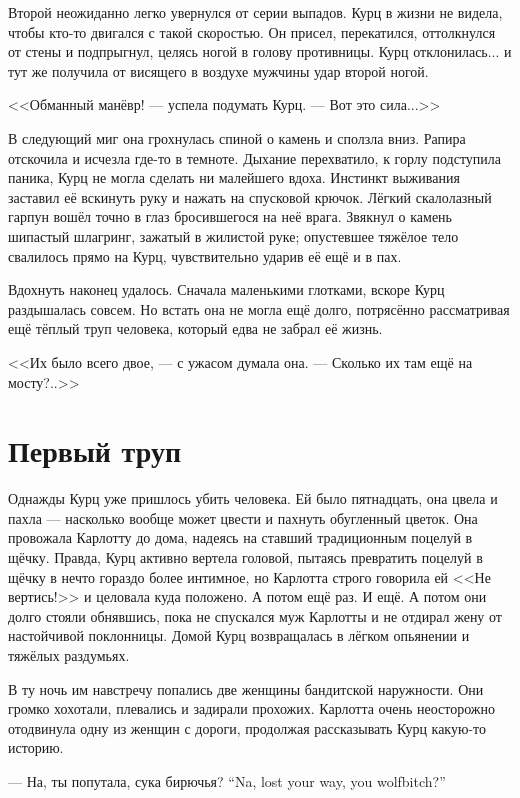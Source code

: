 Второй неожиданно легко увернулся от серии выпадов.
Курц в жизни не видела, чтобы кто-то двигался с такой скоростью.
Он присел, перекатился, оттолкнулся от стены и подпрыгнул, целясь ногой в голову противницы.
Курц отклонилась... и тут же получила от висящего в воздухе мужчины удар второй ногой.

<<Обманный манёвр! --- успела подумать Курц.
--- Вот это сила...>>

В следующий миг она грохнулась спиной о камень и сползла вниз.
Рапира отскочила и исчезла где-то в темноте.
Дыхание перехватило, к горлу подступила паника, Курц не могла сделать ни малейшего вдоха.
Инстинкт выживания заставил её вскинуть руку и нажать на спусковой крючок.
Лёгкий скалолазный гарпун вошёл точно в глаз бросившегося на неё врага.
Звякнул о камень шипастый шлагринг, зажатый в жилистой руке;
опустевшее тяжёлое тело свалилось прямо на Курц, чувствительно ударив её ещё и в пах.

Вдохнуть наконец удалось.
Сначала маленькими глотками, вскоре Курц раздышалась совсем.
Но встать она не могла ещё долго, потрясённо рассматривая ещё тёплый труп человека, который едва не забрал её жизнь.

<<Их было всего двое, --- с ужасом думала она.
--- Сколько их там ещё на мосту?..>>

\section{Первый труп}

Однажды Курц уже пришлось убить человека.
Ей было пятнадцать, она цвела и пахла --- насколько вообще может цвести и пахнуть обугленный цветок.
Она провожала Карлотту до дома, надеясь на ставший традиционным поцелуй в щёчку.
Правда, Курц активно вертела головой, пытаясь превратить поцелуй в щёчку в нечто гораздо более интимное, но Карлотта строго говорила ей <<Не вертись!>> и целовала куда положено.
А потом ещё раз.
И ещё.
А потом они долго стояли обнявшись, пока не спускался муж Карлотты и не отдирал жену от настойчивой поклонницы.
Домой Курц возвращалась в лёгком опьянении и тяжёлых раздумьях.

В ту ночь им навстречу попались две женщины бандитской наружности.
Они громко хохотали, плевались и задирали прохожих.
Карлотта очень неосторожно отодвинула одну из женщин с дороги, продолжая рассказывать Курц какую-то историю.

{--- На, ты попутала, сука бирючья?}
{``Na, lost your way, you wolfbitch?''}

